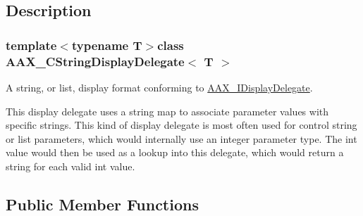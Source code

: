 \subsection{Description}
\subsubsection*{template$<$typename T$>$class A\+A\+X\+\_\+\+C\+String\+Display\+Delegate$<$ T $>$}

A string, or list, display format conforming to \hyperlink{a00092}{A\+A\+X\+\_\+\+I\+Display\+Delegate}. 

This display delegate uses a string map to associate parameter values with specific strings. This kind of display delegate is most often used for control string or list parameters, which would internally use an integer parameter type. The int value would then be used as a lookup into this delegate, which would return a string for each valid int value. \subsection*{Public Member Functions}
